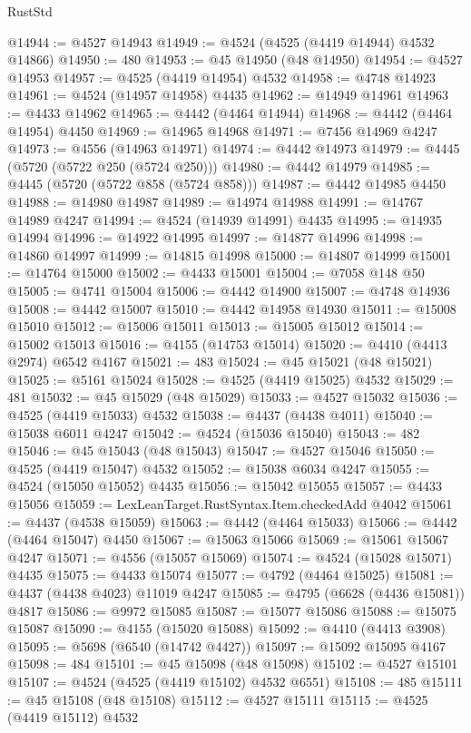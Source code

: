 \begin{lexlean}{RustStd}
\begin{coremodule}
@14944 := @4527 @14943
@14949 := @4524 (@4525 (@4419 @14944) @4532 @14866)
@14950 := 480
@14953 := @45 @14950 (@48 @14950)
@14954 := @4527 @14953
@14957 := @4525 (@4419 @14954) @4532
@14958 := @4748 @14923
@14961 := @4524 (@14957 @14958) @4435
@14962 := @14949 @14961
@14963 := @4433 @14962
@14965 := @4442 (@4464 @14944)
@14968 := @4442 (@4464 @14954) @4450
@14969 := @14965 @14968
@14971 := @7456 @14969 @4247
@14973 := @4556 (@14963 @14971)
@14974 := @4442 @14973
@14979 := @4445 (@5720 (@5722 @250 (@5724 @250)))
@14980 := @4442 @14979
@14985 := @4445 (@5720 (@5722 @858 (@5724 @858)))
@14987 := @4442 @14985 @4450
@14988 := @14980 @14987
@14989 := @14974 @14988
@14991 := @14767 @14989 @4247
@14994 := @4524 (@14939 @14991) @4435
@14995 := @14935 @14994
@14996 := @14922 @14995
@14997 := @14877 @14996
@14998 := @14860 @14997
@14999 := @14815 @14998
@15000 := @14807 @14999
@15001 := @14764 @15000
@15002 := @4433 @15001
@15004 := @7058 @148 @50
@15005 := @4741 @15004
@15006 := @4442 @14900
@15007 := @4748 @14936
@15008 := @4442 @15007
@15010 := @4442 @14958 @14930
@15011 := @15008 @15010
@15012 := @15006 @15011
@15013 := @15005 @15012
@15014 := @15002 @15013
@15016 := @4155 (@14753 @15014)
@15020 := @4410 (@4413 @2974) @6542 @4167
@15021 := 483
@15024 := @45 @15021 (@48 @15021)
@15025 := @5161 @15024
@15028 := @4525 (@4419 @15025) @4532
@15029 := 481
@15032 := @45 @15029 (@48 @15029)
@15033 := @4527 @15032
@15036 := @4525 (@4419 @15033) @4532
@15038 := @4437 (@4438 @4011)
@15040 := @15038 @6011 @4247
@15042 := @4524 (@15036 @15040)
@15043 := 482
@15046 := @45 @15043 (@48 @15043)
@15047 := @4527 @15046
@15050 := @4525 (@4419 @15047) @4532
@15052 := @15038 @6034 @4247
@15055 := @4524 (@15050 @15052) @4435
@15056 := @15042 @15055
@15057 := @4433 @15056
@15059 := LexLeanTarget.RustSyntax.Item.checkedAdd @4042
@15061 := @4437 (@4538 @15059)
@15063 := @4442 (@4464 @15033)
@15066 := @4442 (@4464 @15047) @4450
@15067 := @15063 @15066
@15069 := @15061 @15067 @4247
@15071 := @4556 (@15057 @15069)
@15074 := @4524 (@15028 @15071) @4435
@15075 := @4433 @15074
@15077 := @4792 (@4464 @15025)
@15081 := @4437 (@4438 @4023) @11019 @4247
@15085 := @4795 (@6628 (@4436 @15081)) @4817
@15086 := @9972 @15085
@15087 := @15077 @15086
@15088 := @15075 @15087
@15090 := @4155 (@15020 @15088)
@15092 := @4410 (@4413 @3908)
@15095 := @5698 (@6540 (@14742 @4427))
@15097 := @15092 @15095 @4167
@15098 := 484
@15101 := @45 @15098 (@48 @15098)
@15102 := @4527 @15101
@15107 := @4524 (@4525 (@4419 @15102) @4532 @6551)
@15108 := 485
@15111 := @45 @15108 (@48 @15108)
@15112 := @4527 @15111
@15115 := @4525 (@4419 @15112) @4532

\end{coremodule}
\end{lexlean}
